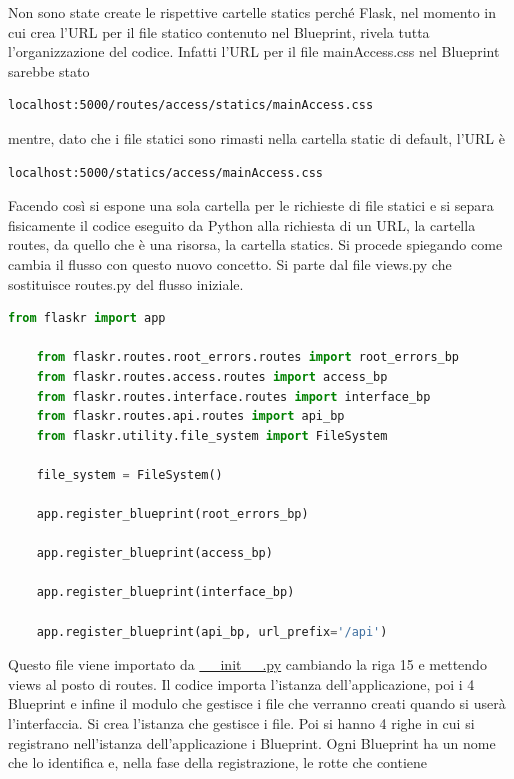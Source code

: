 Non sono state create le rispettive cartelle statics perché Flask, nel momento in cui crea l'URL
per il file statico contenuto nel Blueprint, rivela tutta l'organizzazione del codice.
Infatti l'URL per il file mainAccess.css nel Blueprint sarebbe stato 
\begin{lstlisting}[language=textnonum]
    localhost:5000/routes/access/statics/mainAccess.css
\end{lstlisting}
mentre, dato che i file statici sono rimasti nella cartella static di default, l'URL è
\begin{lstlisting}[language=textnonum]
    localhost:5000/statics/access/mainAccess.css
\end{lstlisting}
Facendo così si espone una sola cartella per le richieste di file statici 
e si separa fisicamente il codice eseguito da Python alla richiesta di un URL, la cartella routes,
da quello che è una risorsa, la cartella statics.\newline
\newline
Si procede spiegando come cambia il flusso con questo nuovo concetto.
\hypertarget{lst:flask-creazione-blueprint-views}
{Si parte dal file views.py che sostituisce routes.py del flusso iniziale.}
\begin{lstlisting}[language=python]
	from flaskr import app

	from flaskr.routes.root_errors.routes import root_errors_bp
	from flaskr.routes.access.routes import access_bp
	from flaskr.routes.interface.routes import interface_bp
	from flaskr.routes.api.routes import api_bp
	from flaskr.utility.file_system import FileSystem
	
	file_system = FileSystem()
	
	app.register_blueprint(root_errors_bp)
	
	app.register_blueprint(access_bp)
	
	app.register_blueprint(interface_bp)
	
	app.register_blueprint(api_bp, url_prefix='/api')
\end{lstlisting}
Questo file viene importato da \hyperlink{lst:flask-creazione-basi-init}{\_\_init\_\_.py}
cambiando la riga 15 e mettendo views al posto di routes.
Il codice importa l'istanza dell'applicazione, poi i 4 Blueprint e 
infine il modulo che gestisce i file che verranno creati quando si userà l'interfaccia.
Si crea l'istanza che gestisce i file.
Poi si hanno 4 righe in cui si registrano nell'istanza dell'applicazione i Blueprint.
Ogni Blueprint ha un nome che lo identifica e, nella fase della registrazione, le rotte che contiene
